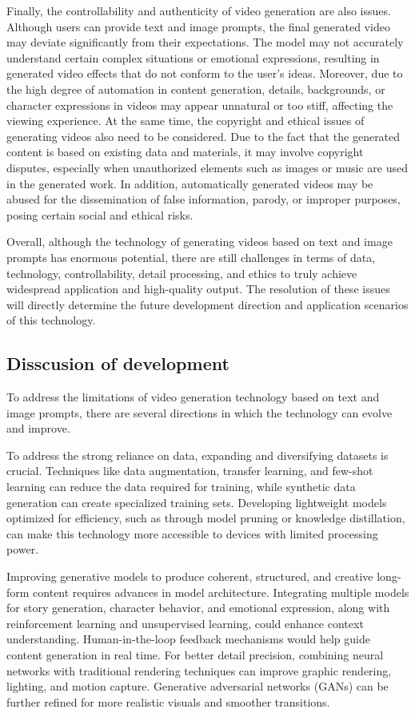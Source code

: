 Finally, the controllability and authenticity of video generation are also issues. Although users can provide text and image prompts, the final generated video may deviate significantly from their expectations. The model may not accurately understand certain complex situations or emotional expressions, resulting in generated video effects that do not conform to the user's ideas. Moreover, due to the high degree of automation in content generation, details, backgrounds, or character expressions in videos may appear unnatural or too stiff, affecting the viewing experience. At the same time, the copyright and ethical issues of generating videos also need to be considered. Due to the fact that the generated content is based on existing data and materials, it may involve copyright disputes, especially when unauthorized elements such as images or music are used in the generated work. In addition, automatically generated videos may be abused for the dissemination of false information, parody, or improper purposes, posing certain social and ethical risks.

Overall, although the technology of generating videos based on text and image prompts has enormous potential, there are still challenges in terms of data, technology, controllability, detail processing, and ethics to truly achieve widespread application and high-quality output. The resolution of these issues will directly determine the future development direction and application scenarios of this technology.

\subsection{Disscusion of development}
To address the limitations of video generation technology based on text and image prompts, there are several directions in which the technology can evolve and improve.

To address the strong reliance on data, expanding and diversifying datasets is crucial. Techniques like data augmentation, transfer learning, and few-shot learning can reduce the data required for training, while synthetic data generation can create specialized training sets. Developing lightweight models optimized for efficiency, such as through model pruning or knowledge distillation, can make this technology more accessible to devices with limited processing power.

Improving generative models to produce coherent, structured, and creative long-form content requires advances in model architecture. Integrating multiple models for story generation, character behavior, and emotional expression, along with reinforcement learning and unsupervised learning, could enhance context understanding. Human-in-the-loop feedback mechanisms would help guide content generation in real time. For better detail precision, combining neural networks with traditional rendering techniques can improve graphic rendering, lighting, and motion capture. Generative adversarial networks (GANs) can be further refined for more realistic visuals and smoother transitions.

